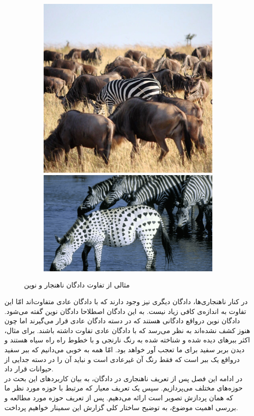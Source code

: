 \documentclass[12pt,a4paper]{report}
\begin{document}
	\begin{figure}[hp]
		  \begin{subfigure}{\linewidth}
			  \includegraphics[width=.5\linewidth]{./images/figures/zibra-anomaly.png}\hfill
			  \includegraphics[width=.5\linewidth]{./images/figures/zibra-novel.png}
		  \end{subfigure}\par\medskip		  
		  \caption{مثالی از تفاوت دادگان ناهنجار و نوین}
		  \label{fig:novel-vs-anomaly}
	\end{figure}

در کنار ناهنجاری‌ها، دادگان دیگری نیز وجود دارند که با دادگان عادی متفاوت‌اند امّا این تفاوت به اندازه‌ی کافی زیاد نیست. به این دادگان اصطلاحا دادگان نوین گفته می‌شود. دادگان نوین درواقع دادگانی هستند که در دسته دادگان عادی قرار می‌گیرند اما چون هنوز کشف نشده‌اند به نظر می‌رسد که با دادگان عادی تفاوت داشته باشند. برای مثال، اکثر ببر‌های دیده شده و شناخته شده به رنگ نارنجی و با خطوط راه راه سیاه هستند و دیدن بربر سفید برای ما تعجب آور خواهد بود. امّا همه به خوبی می‌دانیم که ببر سفید درواقع یک ببر است که فقط رنگ آن غیرعادی است و نباید آن را در دسته جدایی از حیوانات قرار داد.\\

در ادامه این فصل پس از تعریف ناهنجاری در دادگان، به بیان کاربرد‌های این بحث در حوزه‌های مختلف می‌پردازیم. سپس یک تعریف معیار که مرتبط با حوزه مورد نظر ما که همان پردازش تصویر است ارائه می‌دهیم. پس از تعریف حوزه مورد مطالعه و بررسی اهمیت موضوع، به توضیح ساختار کلی گزارش این سمینار خواهیم پرداخت.
		
\end{document}
